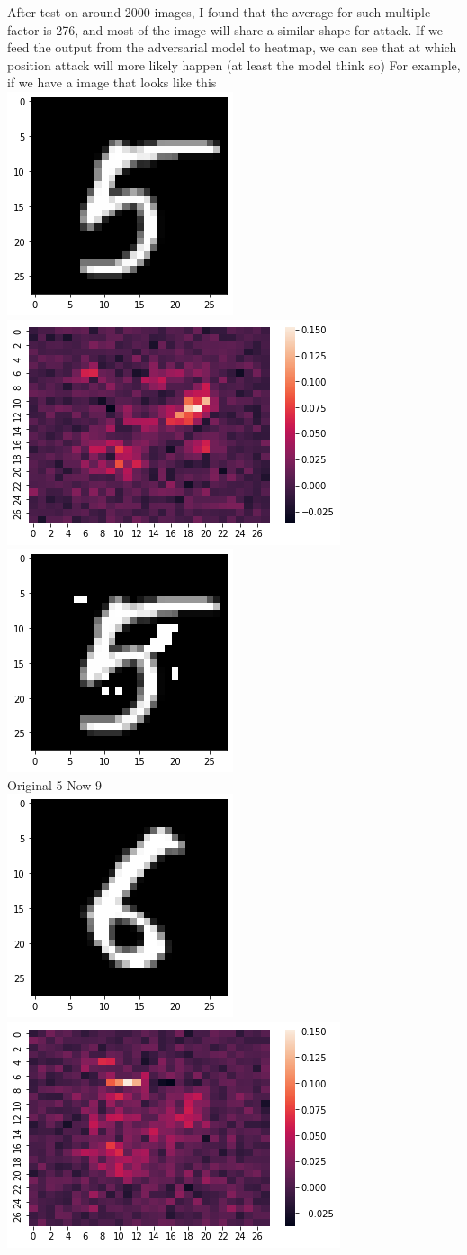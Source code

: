 \documentclass[
]{article}
\begin{document}
\begin{enumerate}
  After test on around 2000 images, I found that the average for such
  multiple factor is 276, and most of the image will share a similar
  shape for attack. If we feed the output from the adversarial model to
  heatmap, we can see that at which position attack will more likely
  happen (at least the model think so) For example, if we have a image
  that looks like this\\
  \includegraphics[width=0.25\columnwidth]{assets/output1.png}
  \includegraphics[width=0.5\columnwidth]{assets/output.png}
  \includegraphics[width=0.25\columnwidth]{assets/output2.png}\\
  Original 5 Now 9\\
  \includegraphics[width=0.25\columnwidth]{assets/output4.png}
  \includegraphics[width=0.5\columnwidth]{assets/output3.png}

\end{enumerate}
\end{document}
